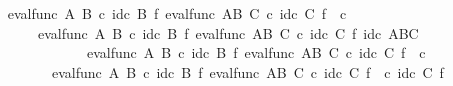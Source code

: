 \begin{isabellebody}
\ \ \ \ \ \ \isamarkupfalse%
\ {\isachardoublequoteopen}eval{\isacharunderscore}{\kern0pt}func\ A\ B\ {\isasymcirc}\isactrlsub c\ id\isactrlsub c\ B\ {\isasymtimes}\isactrlsub f\ {\isacharparenleft}{\kern0pt}eval{\isacharunderscore}{\kern0pt}func\ {\isacharparenleft}{\kern0pt}A\isactrlbsup B\isactrlesup {\isacharparenright}{\kern0pt}\ C\ {\isasymcirc}\isactrlsub c\ {\isacharparenleft}{\kern0pt}id\isactrlsub c\ C\ {\isasymtimes}\isactrlsub f\ {\isasymphi}\isactrlsup {\isasymsharp}\isactrlsup {\isasymsharp}\ {\isasymcirc}\isactrlsub c\ {\isasympsi}\isactrlsup {\isasymsharp}{\isacharparenright}{\kern0pt}{\isacharparenright}{\kern0pt}\ {\isacharequal}{\kern0pt}\isanewline
\ \ \ \ \ \ \ \ \ \ \ \ eval{\isacharunderscore}{\kern0pt}func\ A\ B\ {\isasymcirc}\isactrlsub c\ id\isactrlsub c\ B\ {\isasymtimes}\isactrlsub f\ eval{\isacharunderscore}{\kern0pt}func\ {\isacharparenleft}{\kern0pt}A\isactrlbsup B\isactrlesup {\isacharparenright}{\kern0pt}\ C\ {\isasymcirc}\isactrlsub c\ id\isactrlsub c\ C\ {\isasymtimes}\isactrlsub f\ id\isactrlsub c\ {\isacharparenleft}{\kern0pt}A\isactrlbsup B\isactrlesup \isactrlbsup C\isactrlesup {\isacharparenright}{\kern0pt}{\isachardoublequoteclose}\isanewline
\ \ \ \ \ \ \isamarkupfalse%
\ {\isacharminus}{\kern0pt}\ \isanewline
\ \ \ \ \ \ \ \ \isamarkupfalse%
\ {\isachardoublequoteopen}eval{\isacharunderscore}{\kern0pt}func\ A\ B\ {\isasymcirc}\isactrlsub c\ id\isactrlsub c\ B\ {\isasymtimes}\isactrlsub f\ {\isacharparenleft}{\kern0pt}eval{\isacharunderscore}{\kern0pt}func\ {\isacharparenleft}{\kern0pt}A\isactrlbsup B\isactrlesup {\isacharparenright}{\kern0pt}\ C\ {\isasymcirc}\isactrlsub c\ {\isacharparenleft}{\kern0pt}id\isactrlsub c\ C\ {\isasymtimes}\isactrlsub f\ {\isasymphi}\isactrlsup {\isasymsharp}\isactrlsup {\isasymsharp}\ {\isasymcirc}\isactrlsub c\ {\isasympsi}\isactrlsup {\isasymsharp}{\isacharparenright}{\kern0pt}{\isacharparenright}{\kern0pt}\ {\isacharequal}{\kern0pt}\isanewline
\ \ \ \ \ \ \ \ \ \ \ \ \ \ eval{\isacharunderscore}{\kern0pt}func\ A\ B\ {\isasymcirc}\isactrlsub c\ id\isactrlsub c\ B\ {\isasymtimes}\isactrlsub f\ {\isacharparenleft}{\kern0pt}eval{\isacharunderscore}{\kern0pt}func\ {\isacharparenleft}{\kern0pt}A\isactrlbsup B\isactrlesup {\isacharparenright}{\kern0pt}\ C\ {\isasymcirc}\isactrlsub c\ {\isacharparenleft}{\kern0pt}id\isactrlsub c\ C\ {\isasymtimes}\isactrlsub f\ {\isasymphi}\isactrlsup {\isasymsharp}\isactrlsup {\isasymsharp}{\isacharparenright}{\kern0pt}\ {\isasymcirc}\isactrlsub c\ {\isacharparenleft}{\kern0pt}id\isactrlsub c\ C\ {\isasymtimes}\isactrlsub f\ {\isasympsi}\isactrlsup {\isasymsharp}{\isacharparenright}{\kern0pt}{\isacharparenright}{\kern0pt}{\isachardoublequoteclose}\isanewline

\end{isabellebody}
